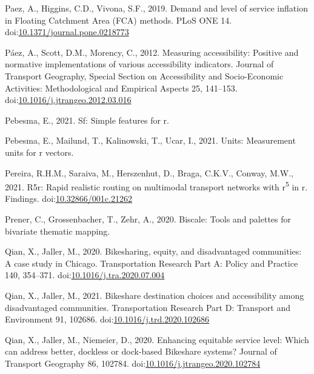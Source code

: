 \documentclass[]{elsarticle} %
\begin{document}
\leavevmode\hypertarget{ref-paezDemandLevelService2019}{}%
Paez, A., Higgins, C.D., Vivona, S.F., 2019. Demand and level of service
inflation in Floating Catchment Area (FCA) methods. PLoS ONE 14.
doi:\href{https://doi.org/10.1371/journal.pone.0218773}{10.1371/journal.pone.0218773}

\leavevmode\hypertarget{ref-paezMeasuringAccessibilityPositive2012}{}%
Páez, A., Scott, D.M., Morency, C., 2012. Measuring accessibility:
Positive and normative implementations of various accessibility
indicators. Journal of Transport Geography, Special Section on
Accessibility and Socio-Economic Activities: Methodological and
Empirical Aspects 25, 141--153.
doi:\href{https://doi.org/10.1016/j.jtrangeo.2012.03.016}{10.1016/j.jtrangeo.2012.03.016}

\leavevmode\hypertarget{ref-R-sf}{}%
Pebesma, E., 2021. Sf: Simple features for r.

\leavevmode\hypertarget{ref-R-units}{}%
Pebesma, E., Mailund, T., Kalinowski, T., Ucar, I., 2021. Units:
Measurement units for r vectors.

\leavevmode\hypertarget{ref-Pereira2021r5r}{}%
Pereira, R.H.M., Saraiva, M., Herszenhut, D., Braga, C.K.V., Conway,
M.W., 2021. R5r: Rapid realistic routing on multimodal transport
networks with r\textsuperscript{5} in r. Findings.
doi:\href{https://doi.org/10.32866/001c.21262}{10.32866/001c.21262}

\leavevmode\hypertarget{ref-R-biscale}{}%
Prener, C., Grossenbacher, T., Zehr, A., 2020. Biscale: Tools and
palettes for bivariate thematic mapping.

\leavevmode\hypertarget{ref-qianBikesharingEquityDisadvantaged2020}{}%
Qian, X., Jaller, M., 2020. Bikesharing, equity, and disadvantaged
communities: A case study in Chicago. Transportation Research Part A:
Policy and Practice 140, 354--371.
doi:\href{https://doi.org/10.1016/j.tra.2020.07.004}{10.1016/j.tra.2020.07.004}

\leavevmode\hypertarget{ref-qianBikeshareDestinationChoices2021}{}%
Qian, X., Jaller, M., 2021. Bikeshare destination choices and
accessibility among disadvantaged communities. Transportation Research
Part D: Transport and Environment 91, 102686.
doi:\href{https://doi.org/10.1016/j.trd.2020.102686}{10.1016/j.trd.2020.102686}

\leavevmode\hypertarget{ref-qianEnhancingEquitableService2020}{}%
Qian, X., Jaller, M., Niemeier, D., 2020. Enhancing equitable service
level: Which can address better, dockless or dock-based Bikeshare
systems? Journal of Transport Geography 86, 102784.
doi:\href{https://doi.org/10.1016/j.jtrangeo.2020.102784}{10.1016/j.jtrangeo.2020.102784}
\end{document}
